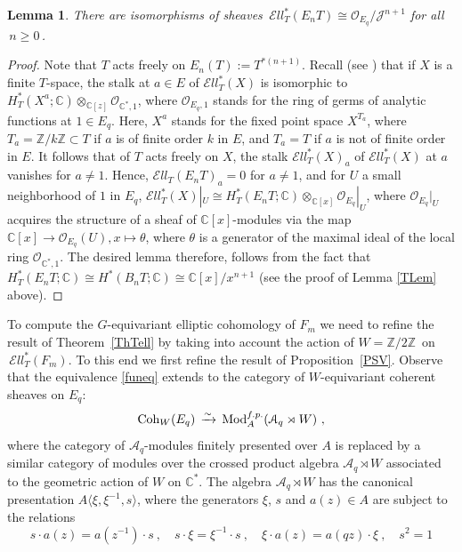 \documentclass[11pt]{amsart}
\newtheorem{lemma}[theorem]{Lemma}
\theoremstyle{definition}
\theoremstyle{remark}
\numberwithin{equation}{section}
\newcommand{\la}{\label}
\def\c{\mathbb{C}}
\def\A{\mathcal{A}}
\def\Z{\mathbb{Z}}
\def\O{\mathcal{O}}
\def\Mod{\mathrm{Mod}}
\def\Ell{\mathcal{E}{ll}}
\def\Coh{\mathrm{Coh}}
\def \cF{\mathcal{F}}
\begin{document}
\begin{lemma} \la{ecohtj} There are isomorphisms of sheaves
$\,\Ell^{\ast}_T(E_n T) \cong \O_{E_q}/{\mathcal J}^{n+1}$ for all $\,n\geq 0\,$.
\end{lemma}
%
\begin{proof}
 Note that $T$ acts freely on $E_n(T) := T^{\ast (n+1)}$. Recall (see \cite[Sect. 3.2]{Ros01}) that if $X$ is a finite $T$-space, the stalk at $a \in E$ of $\Ell^{\ast}_T(X)$ is isomorphic to $H^{\ast}_T(X^a;\c) \otimes_{\c[z]} \O_{\c^{\ast},1}$, where $\O_{E_q,1}$ stands for the ring of germs of analytic functions at $1 \in E_q$. Here, $X^a$ stands for the fixed point space $X^{T_a}$, where $T_a=\Z/k\Z \subset T$ if $a$ is of finite order $k$ in $E$, and $T_a=T$ if $a$ is not of finite order in $E$. It follows that of $T$ acts freely on $X$, the stalk $\Ell^{\ast}_T(X)_a$ of $\Ell^{\ast}_T(X)$ at $a$ vanishes for $a \neq 1$. Hence, $\Ell_T(E_n T)_a=0$ for $a \neq 1$, and for $U$ a small neighborhood of $1$ in $E_q$, $\Ell^{\ast}_T(X)|_U \cong H^{\ast}_T(E_n T;\c) \otimes_{\c[x]} \O_{E_q}|_U$, where $\O_{E_q}|_U$ acquires the structure of a sheaf of $\c[x]$-modules via the map $\c[x] \to \O_{E_q}(U), x \mapsto \theta$, where $\theta$ is a generator of the maximal ideal of the local ring $\O_{\c^{\ast},1}$. The desired lemma therefore, follows from the fact that $H^{\ast}_T(E_n T;\c) \cong H^\ast(B_n T;\c) \cong \c[x]/x^{n+1}$ (see the proof of Lemma \ref{TLem} above).
\end{proof}
%
To compute the $G$-equivariant elliptic cohomology of $ F_m $ we need to refine the result of
Theorem~\ref{ThTell} by taking into account the action of $W = \Z/2\Z\,$ on $\,\Ell_T^*(F_m)$. To this end we first refine the result of Proposition~\ref{PSV}. Observe that the equivalence \eqref{funeq} extends to the category  of $W$-equivariant coherent sheaves on $E_q$: 
%
\begin{equation}
\la{funeqW}
 \Coh_W(E_q) \,\xrightarrow{\sim}\, \Mod^{\rm f.p.}_{A}(\A_q \rtimes W)\ ,
 \end{equation}
%
where the category of $\A_q$-modules finitely presented over $A$ is replaced by a similar category of modules over the crossed product algebra $ \A_q \rtimes W $ associated to the geometric action of $W $ on $ \c^* $. The algebra $ \A_q \rtimes W $ has the canonical presentation $  A \langle \xi, \xi^{-1}, s \rangle $, where the generators
$ \xi $, $s$ and $ a(z) \in A $ are subject to the relations
%
$$
s \cdot a(z) = a(z^{-1}) \cdot s\ ,\quad s \cdot \xi = \xi^{-1} \cdot s\ ,\quad \xi \cdot a(z) = a(qz) \cdot \xi\ ,\quad s^2 = 1
$$
\end{document}

